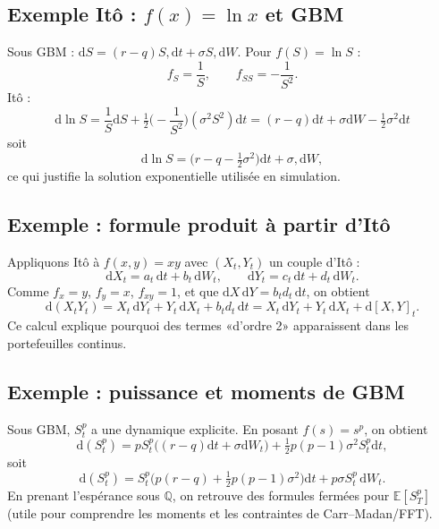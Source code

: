 \documentclass[11pt,a4paper]{report}
\theoremstyle{definition}
\theoremstyle{plain}
\theoremstyle{remark}
\newcommand{\dd}{\mathrm{d}}
\newcommand{\E}{\mathbb{E}}
\newcommand{\1}{\mathbf{1}}
\newcommand{\Qmeas}{\mathbb{Q}}
\begin{document}
\subsection*{Exemple Itô : $f(x)=\ln x$ et GBM}
Sous GBM : $\dd S=(r-q)S,\dd t+\sigma S,\dd W$.
Pour $f(S)=\ln S$ :
\[
f_S=\frac1S,\qquad f_{SS}=-\frac1{S^2}.
\]
Itô :
\[
\dd \ln S = \frac1S\dd S +\tfrac12\Big(-\frac1{S^2}\Big)(\sigma^2 S^2)\dd t
= (r-q)\dd t+\sigma \dd W - \tfrac12\sigma^2 \dd t
\]
soit
\[
\dd \ln S = \big(r-q-\tfrac12\sigma^2\big)\dd t + \sigma,\dd W,
\]
ce qui justifie la solution exponentielle utilisée en simulation.

\subsection*{Exemple : formule produit à partir d'Itô}
Appliquons Itô à $f(x,y)=xy$ avec $(X_t,Y_t)$ un couple d'Itô :
\[
\dd X_t=a_t\,\dd t+b_t\,\dd W_t,\qquad \dd Y_t=c_t\,\dd t+d_t\,\dd W_t.
\]
Comme $f_x=y$, $f_y=x$, $f_{xy}=1$, et que $\dd X\,\dd Y=b_td_t\,\dd t$, on obtient
\[
\dd(X_tY_t)=X_t\,\dd Y_t + Y_t\,\dd X_t + b_td_t\,\dd t
          =X_t\,\dd Y_t + Y_t\,\dd X_t + \dd[X,Y]_t.
\]
Ce calcul explique pourquoi des termes «d'ordre 2» apparaissent dans les portefeuilles continus.

\subsection*{Exemple : puissance et moments de GBM}
Sous GBM, $S_t^p$ a une dynamique explicite.
En posant $f(s)=s^p$, on obtient
\[
\dd(S_t^p)=pS_t^{p}\Big((r-q)\dd t+\sigma\dd W_t\Big)+\tfrac12 p(p-1)\sigma^2 S_t^{p}\dd t,
\]
soit
\[
\dd(S_t^p)=S_t^p\Big(p(r-q)+\tfrac12 p(p-1)\sigma^2\Big)\dd t + p\sigma S_t^p\,\dd W_t.
\]
En prenant l'espérance sous $\Qmeas$, on retrouve des formules fermées pour $\E[S_T^p]$ (utile pour comprendre les moments et les contraintes de Carr--Madan/FFT).


\end{document}
